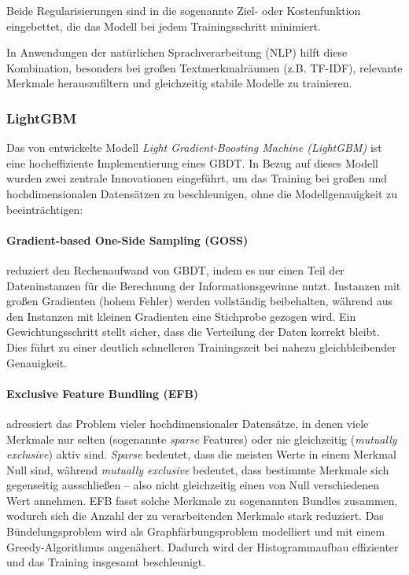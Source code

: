 Beide Regularisierungen sind in die sogenannte Ziel- oder Kostenfunktion eingebettet, die das Modell bei jedem Trainingsschritt minimiert. 

In Anwendungen der natürlichen Sprachverarbeitung (NLP) hilft diese Kombination, besonders bei großen Textmerkmalräumen (z.B. TF-IDF), 
relevante Merkmale herauszufiltern und gleichzeitig stabile Modelle zu trainieren\cite{chen2016xgboost}.

\subsubsection{LightGBM}

Das von \cite{ke2017} entwickelte Modell \textit{Light Gradient-Boosting Machine (LightGBM)} ist eine hocheffiziente Implementierung eines GBDT. 
In Bezug auf dieses Modell wurden zwei zentrale Innovationen eingeführt, um das Training bei großen und hochdimensionalen Datensätzen zu beschleunigen, 
ohne die Modellgenauigkeit zu beeinträchtigen:

\paragraph{Gradient-based One-Side Sampling (GOSS)} reduziert den Rechenaufwand von GBDT, indem es nur einen Teil der Dateninstanzen für die Berechnung 
der Informationsgewinne nutzt. Instanzen mit großen Gradienten (hohem Fehler) werden vollständig beibehalten, während aus den Instanzen mit kleinen 
Gradienten eine Stichprobe gezogen wird. Ein Gewichtungsschritt stellt sicher, dass die Verteilung der Daten korrekt bleibt. Dies führt zu einer
deutlich schnelleren Trainingszeit bei nahezu gleichbleibender Genauigkeit.

\paragraph{Exclusive Feature Bundling (EFB)} adressiert das Problem vieler hochdimensionaler Datensätze, in denen viele Merkmale nur selten 
(sogenannte \textit{sparse} Features) oder nie gleichzeitig (\textit{mutually exclusive}) aktiv sind. 
\textit{Sparse} bedeutet, dass die meisten Werte in einem Merkmal Null sind, während \textit{mutually exclusive} bedeutet, dass bestimmte Merkmale sich 
gegenseitig ausschließen – also nicht gleichzeitig einen von Null verschiedenen Wert annehmen. 
EFB fasst solche Merkmale zu sogenannten Bundles zusammen, wodurch sich die Anzahl der zu verarbeitenden Merkmale stark reduziert. 
Das Bündelungsproblem wird als Graphfärbungsproblem modelliert und mit einem Greedy-Algorithmus angenähert.
Dadurch wird der Histogrammaufbau effizienter und das Training insgesamt beschleunigt.

